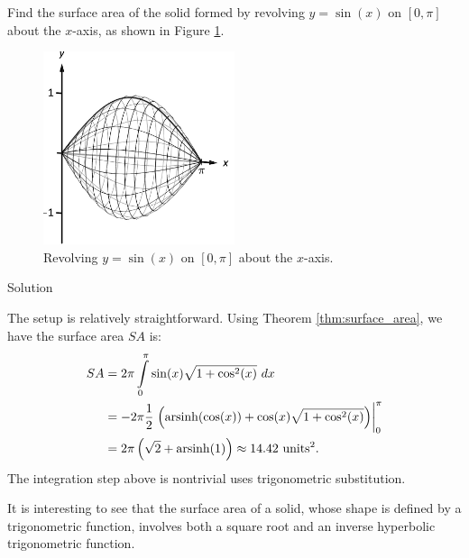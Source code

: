 \begin{example}\label{ex_sa1}
Find the surface area of the solid formed by revolving $y=\sin(x)$ on $[0,\pi]$ about the $x$-axis, as shown in Figure \ref{fig_int_app_26}.

	\begin{figure}[H]
	\begin{center}
			\includegraphics[width=0.5\textwidth]{fig_int_app_26}
	\caption{Revolving $y=\sin (x)$ on $[0,\pi]$ about the $x$-axis.}
	\label{fig_int_app_26}
	\end{center}
\end{figure}


Solution 

The setup is relatively straightforward. Using Theorem \ref{thm:surface_area}, we have the surface area $SA$ is:
\begin{align*}
SA  &=	2\pi\int\limits_0^\pi \sin(x)\sqrt{1+\cos^2(x)}\ dx \\
		&=	-2\pi\frac12\left.\left(\arsinh(\cos(x))+\cos(x)\sqrt{1+\cos^2(x)}\right)\right|_0^\pi \\
		&= 2\pi\left(\sqrt{2}+\arsinh(1)\right) \approx 14.42\ \text{units}^2.%
\end{align*}
The integration step above is nontrivial uses trigonometric substitution. 

It is interesting to see that the surface area of a solid, whose shape is defined by a trigonometric function, involves both a square root and an inverse hyperbolic trigonometric function.
\end{example}


